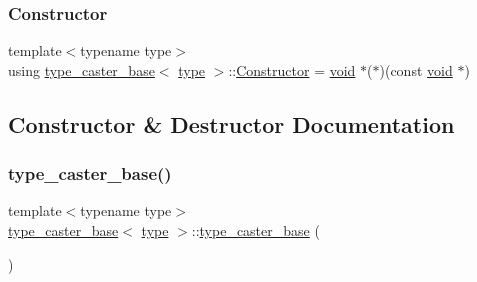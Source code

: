 \subsubsection{\texorpdfstring{Constructor}{Constructor}}
{\footnotesize\ttfamily template$<$typename type$>$ \\
using \mbox{\hyperlink{classtype__caster__base}{type\+\_\+caster\+\_\+base}}$<$ \mbox{\hyperlink{_s_d_l__opengl_8h_ad5ddf6fca7b585646515660e810e0188}{type}} $>$\+::\mbox{\hyperlink{classtype__caster__base_ab5020d71e0fb1d9e827af0f280c575ac}{Constructor}} =  \mbox{\hyperlink{_s_d_l__opengles2__gl2ext_8h_ae5d8fa23ad07c48bb609509eae494c95}{void}} $\ast$($\ast$)(const \mbox{\hyperlink{_s_d_l__opengles2__gl2ext_8h_ae5d8fa23ad07c48bb609509eae494c95}{void}} $\ast$)\hspace{0.3cm}{\ttfamily [protected]}}



\subsection{Constructor \& Destructor Documentation}
\mbox{\label{classtype__caster__base_af0269903887f3e6cdfdfa761a51d4246}} 
\subsubsection{\texorpdfstring{type\_caster\_base()}{type\_caster\_base()}\hspace{0.1cm}{\footnotesize\ttfamily [1/2]}}
{\footnotesize\ttfamily template$<$typename type$>$ \\
\mbox{\hyperlink{classtype__caster__base}{type\+\_\+caster\+\_\+base}}$<$ \mbox{\hyperlink{_s_d_l__opengl_8h_ad5ddf6fca7b585646515660e810e0188}{type}} $>$\+::\mbox{\hyperlink{classtype__caster__base}{type\+\_\+caster\+\_\+base}} (\begin{DoxyParamCaption}{ }\end{DoxyParamCaption})\hspace{0.3cm}{\ttfamily [inline]}}

\mbox{\label{classtype__caster__base_af4a4330eee584b6dbd6f081989e3ac3b}} 
